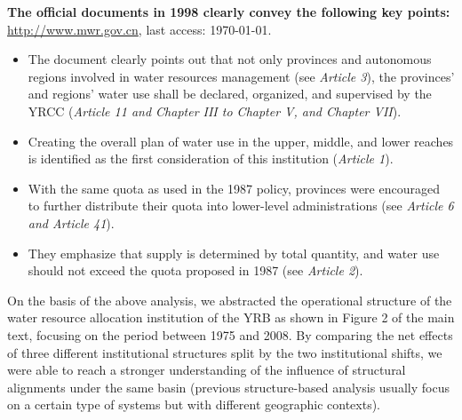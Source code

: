 \textbf{The official documents in 1998 clearly convey the following key points:}
\href{http://www.mwr.gov.cn/ztpd/2013ztbd/2013fxkh/fxkhswcbcs/cs/flfg/201304/t20130411_433489.html}{http://www.mwr.gov.cn}, last access: \today.
\begin{itemize}
	\item The document clearly points out that not only provinces and autonomous regions involved in water resources management (see \textit{Article 3}), the provinces’ and regions’ water use shall be declared, organized, and supervised by the YRCC (\textit{Article 11 and Chapter III to Chapter V, and Chapter VII}).
	\item Creating the overall plan of water use in the upper, middle, and lower reaches is identified as the first consideration of this institution (\textit{Article 1}).
	\item With the same quota as used in the 1987 policy, provinces were encouraged to further distribute their quota into lower-level administrations (see \textit{Article 6 and Article 41}).
	\item They emphasize that supply is determined by total quantity, and water use should not exceed the quota proposed in 1987 (see \textit{Article 2}).
\end{itemize}

On the basis of the above analysis, we abstracted the operational structure of the water resource allocation institution of the YRB as shown in Figure 2 of the main text, focusing on the period between 1975 and 2008. By comparing the net effects of three different institutional structures split by the two institutional shifts, we were able to reach a stronger understanding of the influence of structural alignments under the same basin (previous structure-based analysis usually focus on a certain type of systems but with different geographic contexts).


